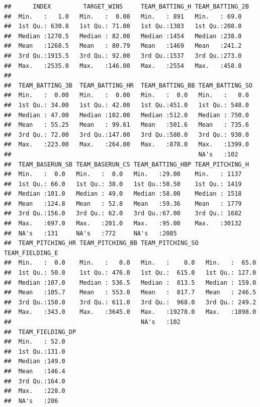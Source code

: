 \documentclass[
]{article}
\begin{document}
\begin{verbatim}
##      INDEX         TARGET_WINS     TEAM_BATTING_H TEAM_BATTING_2B
##  Min.   :   1.0   Min.   :  0.00   Min.   : 891   Min.   : 69.0  
##  1st Qu.: 630.8   1st Qu.: 71.00   1st Qu.:1383   1st Qu.:208.0  
##  Median :1270.5   Median : 82.00   Median :1454   Median :238.0  
##  Mean   :1268.5   Mean   : 80.79   Mean   :1469   Mean   :241.2  
##  3rd Qu.:1915.5   3rd Qu.: 92.00   3rd Qu.:1537   3rd Qu.:273.0  
##  Max.   :2535.0   Max.   :146.00   Max.   :2554   Max.   :458.0  
##                                                                  
##  TEAM_BATTING_3B  TEAM_BATTING_HR  TEAM_BATTING_BB TEAM_BATTING_SO 
##  Min.   :  0.00   Min.   :  0.00   Min.   :  0.0   Min.   :   0.0  
##  1st Qu.: 34.00   1st Qu.: 42.00   1st Qu.:451.0   1st Qu.: 548.0  
##  Median : 47.00   Median :102.00   Median :512.0   Median : 750.0  
##  Mean   : 55.25   Mean   : 99.61   Mean   :501.6   Mean   : 735.6  
##  3rd Qu.: 72.00   3rd Qu.:147.00   3rd Qu.:580.0   3rd Qu.: 930.0  
##  Max.   :223.00   Max.   :264.00   Max.   :878.0   Max.   :1399.0  
##                                                    NA's   :102     
##  TEAM_BASERUN_SB TEAM_BASERUN_CS TEAM_BATTING_HBP TEAM_PITCHING_H
##  Min.   :  0.0   Min.   :  0.0   Min.   :29.00    Min.   : 1137  
##  1st Qu.: 66.0   1st Qu.: 38.0   1st Qu.:50.50    1st Qu.: 1419  
##  Median :101.0   Median : 49.0   Median :58.00    Median : 1518  
##  Mean   :124.8   Mean   : 52.8   Mean   :59.36    Mean   : 1779  
##  3rd Qu.:156.0   3rd Qu.: 62.0   3rd Qu.:67.00    3rd Qu.: 1682  
##  Max.   :697.0   Max.   :201.0   Max.   :95.00    Max.   :30132  
##  NA's   :131     NA's   :772     NA's   :2085                    
##  TEAM_PITCHING_HR TEAM_PITCHING_BB TEAM_PITCHING_SO  TEAM_FIELDING_E 
##  Min.   :  0.0    Min.   :   0.0   Min.   :    0.0   Min.   :  65.0  
##  1st Qu.: 50.0    1st Qu.: 476.0   1st Qu.:  615.0   1st Qu.: 127.0  
##  Median :107.0    Median : 536.5   Median :  813.5   Median : 159.0  
##  Mean   :105.7    Mean   : 553.0   Mean   :  817.7   Mean   : 246.5  
##  3rd Qu.:150.0    3rd Qu.: 611.0   3rd Qu.:  968.0   3rd Qu.: 249.2  
##  Max.   :343.0    Max.   :3645.0   Max.   :19278.0   Max.   :1898.0  
##                                    NA's   :102                       
##  TEAM_FIELDING_DP
##  Min.   : 52.0   
##  1st Qu.:131.0   
##  Median :149.0   
##  Mean   :146.4   
##  3rd Qu.:164.0   
##  Max.   :228.0   
##  NA's   :286
\end{verbatim}
\end{document}
